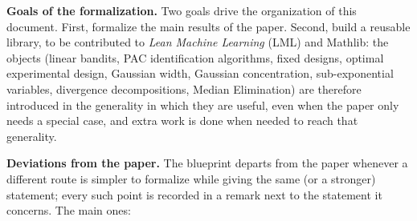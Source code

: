 \textbf{Goals of the formalization.} Two goals drive the organization of this document.
First, formalize the main results of the paper. Second, build a reusable library, to be
contributed to \emph{Lean Machine Learning} (LML) and Mathlib: the objects (linear bandits,
PAC identification algorithms, fixed designs, optimal experimental design, Gaussian width,
Gaussian concentration, sub-exponential variables, divergence decompositions, Median
Elimination) are therefore introduced in the generality in which they are useful, even when
the paper only needs a special case, and extra work is done when needed to reach that
generality.

\textbf{Deviations from the paper.} The blueprint departs from the paper whenever a
different route is simpler to formalize while giving the same (or a stronger) statement;
every such point is recorded in a remark next to the statement it concerns. The main ones:
